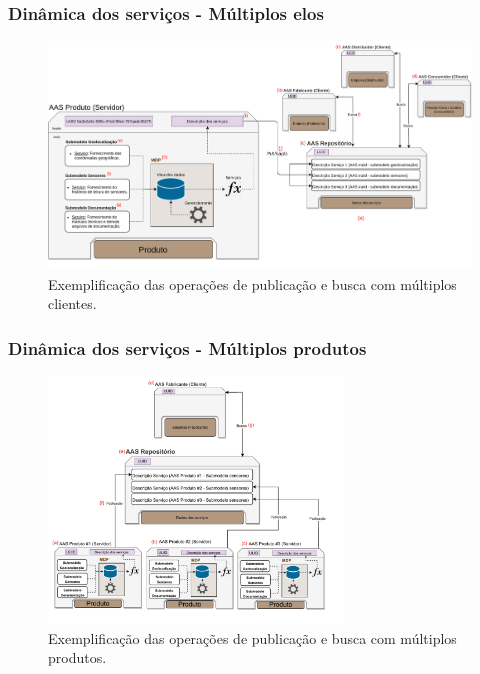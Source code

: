 \documentclass[10pt]{beamer}
\begin{document}
\begin{frame}
	\frametitle{Dinâmica dos serviços - Múltiplos elos}
	
	\begin{figure}[htb]
		\centering
		\caption{Exemplificação das operações de publicação e busca com múltiplos clientes.}
		\label{fig:ppt-webservice-multielo}
		\includegraphics[width=1\textwidth]{ppt-webservice-multielo}
	\end{figure}
	
\end{frame}
\begin{frame}
	\frametitle{Dinâmica dos serviços - Múltiplos produtos}
	
	\begin{figure}[htb]
		\centering
		\caption{Exemplificação das operações de publicação e busca com múltiplos produtos.}
		\label{fig:webservice-multiproduto}
		\includegraphics[width=0.7\textwidth]{webservice-multiproduto}
	\end{figure}
	
\end{frame}
\end{document}
